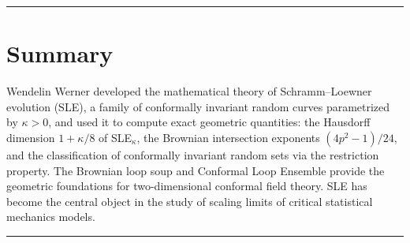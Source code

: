 \begin{center}\rule{0.5\linewidth}{0.5pt}\end{center}

\section*{Summary}

Wendelin Werner developed the mathematical theory of Schramm--Loewner evolution (SLE), a family of conformally invariant random curves parametrized by $\kappa > 0$, and used it to compute exact geometric quantities: the Hausdorff dimension $1 + \kappa/8$ of SLE$_\kappa$, the Brownian intersection exponents $(4p^2-1)/24$, and the classification of conformally invariant random sets via the restriction property. The Brownian loop soup and Conformal Loop Ensemble provide the geometric foundations for two-dimensional conformal field theory. SLE has become the central object in the study of scaling limits of critical statistical mechanics models.

\begin{center}\rule{0.5\linewidth}{0.5pt}\end{center}
